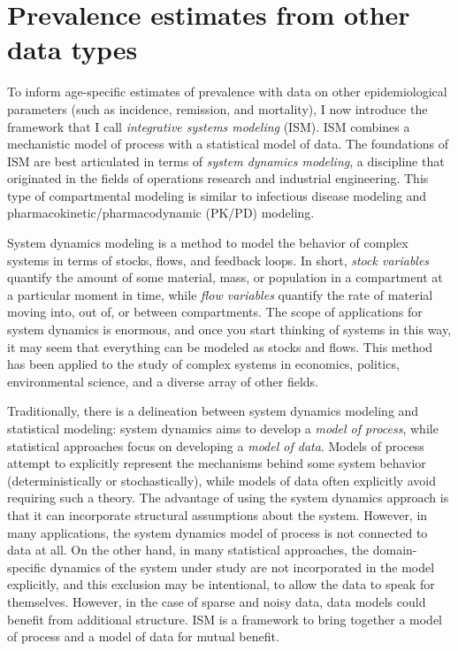 \chapter{Prevalence estimates from other data types}
\label{theory-system_dynamics}

To inform age-specific estimates of prevalence with data on
other epidemiological parameters (such as incidence, remission, and
mortality), I now introduce the framework that I call
\emph{integrative systems modeling} (ISM).  ISM combines a mechanistic model of
process with a statistical model of data.  The foundations of ISM are
best articulated in terms of \emph{system dynamics modeling}, a
discipline that originated in the fields of operations research and
industrial engineering. \cite{forrester_industrial_1961,
  forrester_urban_1969,forrester_world_1973,meadows_thinking_2008}
This type of compartmental modeling is similar to infectious disease
modeling \cite{hethcote_qualitative_1976,anderson_infectious_1992,
  diekmann_mathematical_2000,keeling_modeling_2008,
  vynnycky_introduction_2010} and pharmacokinetic/pharmacodynamic
(PK/PD) modeling.
\cite{sheiner_modelling_1972,jacquez_compartmental_1985,yuh_population_1994,
  barrett_saam_1998,jacquez_modeling_1999,atkinson_introduction_2007}

System dynamics modeling is a method to model the behavior of complex
systems in terms of stocks, flows, and feedback loops.  In short,
\emph{stock variables} quantify the amount of some material, mass, or
population in a compartment at a particular moment in time, while
\emph{flow variables} quantify the rate of material moving into, out
of, or between compartments. The scope of applications for system
dynamics is enormous, and once you start thinking of systems in this
way, it may seem that everything can be modeled as stocks and
flows. This method has been applied to the study of complex systems in
economics, politics, environmental science, and a diverse array of
other fields.  \cite{meadows_thinking_2008,jacquez_modeling_1999,
  harte_consider_1988,richardson_feedback_1991}


Traditionally, there is a delineation between system dynamics modeling
and statistical modeling: system dynamics aims to
develop a \emph{model of process}, while statistical approaches focus
on developing a \emph{model of data}. Models of process attempt to
explicitly represent the mechanisms behind some system behavior
(deterministically or stochastically), while models of data often
explicitly avoid requiring such a theory. The advantage of using the
system dynamics approach is that it can incorporate structural
assumptions about the system.  However, in many applications, the
system dynamics model of process is not connected to data at all.  On
the other hand, in many statistical approaches, the domain-specific
dynamics of the system under study are not incorporated in the model
explicitly, and this exclusion may be intentional, to allow the data
to speak for themselves.  However, in the case of sparse and noisy data, data
models could benefit from additional structure.  ISM
is a framework to bring together a model of process
and a model of data for mutual benefit.

